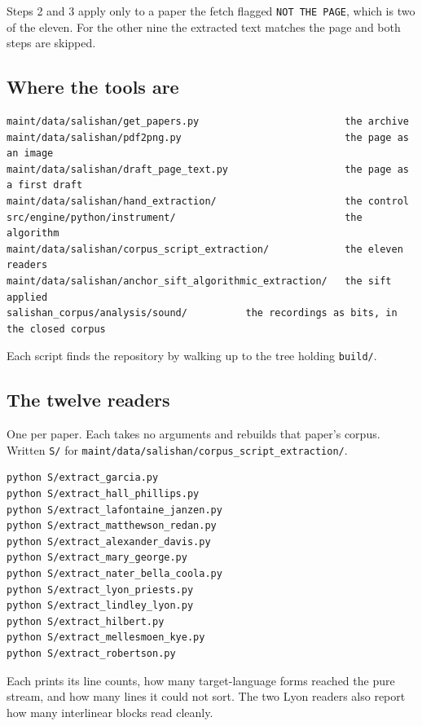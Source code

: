 Steps 2 and 3 apply only to a paper the fetch flagged \texttt{NOT THE PAGE}, which is two of the eleven. For the other nine the extracted text matches the page and both steps are skipped.

\subsection{Where the tools are}

\begin{lstlisting}[breaklines=true,breakatwhitespace=false,basicstyle=\ttfamily\small]
maint/data/salishan/get_papers.py                         the archive
maint/data/salishan/pdf2png.py                            the page as an image
maint/data/salishan/draft_page_text.py                    the page as a first draft
maint/data/salishan/hand_extraction/                      the control
src/engine/python/instrument/                             the algorithm
maint/data/salishan/corpus_script_extraction/             the eleven readers
maint/data/salishan/anchor_sift_algorithmic_extraction/   the sift applied
salishan_corpus/analysis/sound/          the recordings as bits, in the closed corpus
\end{lstlisting}

Each script finds the repository by walking up to the tree holding \texttt{build/\allowbreak{}}.

\subsection{The twelve readers}

One per paper. Each takes no arguments and rebuilds that paper's corpus. Written \texttt{S/\allowbreak{}} for \texttt{maint/\allowbreak{}data/\allowbreak{}salishan/\allowbreak{}corpus\_\allowbreak{}script\_\allowbreak{}extraction/\allowbreak{}}.

\begin{lstlisting}[breaklines=true,breakatwhitespace=false,basicstyle=\ttfamily\small]
python S/extract_garcia.py
python S/extract_hall_phillips.py
python S/extract_lafontaine_janzen.py
python S/extract_matthewson_redan.py
python S/extract_alexander_davis.py
python S/extract_mary_george.py
python S/extract_nater_bella_coola.py
python S/extract_lyon_priests.py
python S/extract_lindley_lyon.py
python S/extract_hilbert.py
python S/extract_mellesmoen_kye.py
python S/extract_robertson.py
\end{lstlisting}

Each prints its line counts, how many target-language forms reached the pure stream, and how many lines it could not sort. The two Lyon readers also report how many interlinear blocks read cleanly.

